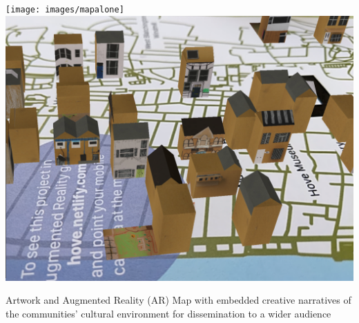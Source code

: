 \documentclass[acmlarge,screen,dvipsnames]{acmart}
\begin{document}
%
\begin{teaserfigure}
\centering
 \texttt{[image: images/mapalone]}
 \includegraphics[width=.40\linewidth]{images/screenshoot}
  \caption{Artwork and Augmented Reality (AR) Map
with embedded creative narratives of the communities' cultural environment 
for dissemination to a wider audience\vspace*{0.5\baselineskip}}
  \label{fig:teaser}
\end{teaserfigure}
\end{document}

